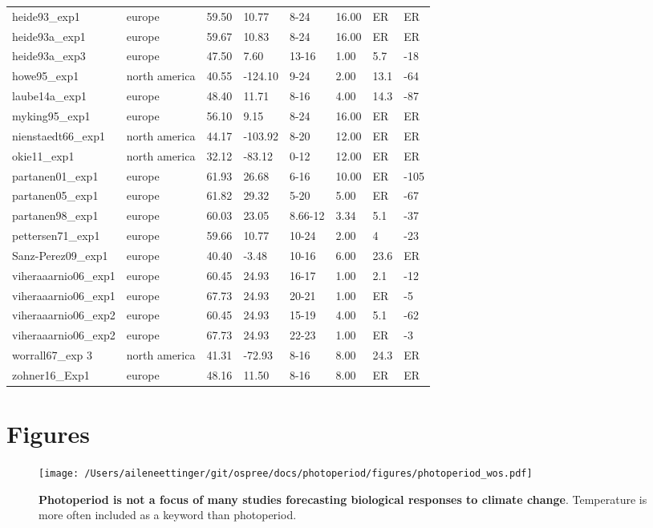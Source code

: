 \documentclass{article}
\begin{document}
\begin{table}[ht]
\begin{tabular}{|p{}|p{}|p{}|p{}|p{}|p{}|p{}|p{}|}
  heide93\_exp1 & europe & 59.50 & 10.77 & 8-24 & 16.00 & ER & ER \\ 
  heide93a\_exp1 & europe & 59.67 & 10.83 & 8-24 & 16.00 & ER & ER \\ 
  heide93a\_exp3 & europe & 47.50 & 7.60 & 13-16 & 1.00 & 5.7 & -18 \\ 
  howe95\_exp1 & north america & 40.55 & -124.10 & 9-24 & 2.00 & 13.1 & -64 \\ 
  laube14a\_exp1 & europe & 48.40 & 11.71 & 8-16 & 4.00 & 14.3 & -87 \\ 
  myking95\_exp1 & europe & 56.10 & 9.15 & 8-24 & 16.00 & ER & ER \\ 
  nienstaedt66\_exp1 & north america & 44.17 & -103.92 & 8-20 & 12.00 & ER & ER \\ 
  okie11\_exp1 & north america & 32.12 & -83.12 & 0-12 & 12.00 & ER & ER \\ 
  partanen01\_exp1 & europe & 61.93 & 26.68 & 6-16 & 10.00 & ER & -105 \\ 
  partanen05\_exp1 & europe & 61.82 & 29.32 & 5-20 & 5.00 & ER & -67 \\ 
  partanen98\_exp1 & europe & 60.03 & 23.05 & 8.66-12 & 3.34 & 5.1 & -37 \\ 
  pettersen71\_exp1 & europe & 59.66 & 10.77 & 10-24 & 2.00 & 4 & -23 \\ 
  Sanz-Perez09\_exp1 & europe & 40.40 & -3.48 & 10-16 & 6.00 & 23.6 & ER \\ 
  viheraaarnio06\_exp1 & europe & 60.45 & 24.93 & 16-17 & 1.00 & 2.1 & -12 \\ 
  viheraaarnio06\_exp1 & europe & 67.73 & 24.93 & 20-21 & 1.00 & ER & -5 \\ 
  viheraaarnio06\_exp2 & europe & 60.45 & 24.93 & 15-19 & 4.00 & 5.1 & -62 \\ 
  viheraaarnio06\_exp2 & europe & 67.73 & 24.93 & 22-23 & 1.00 & ER & -3 \\ 
  worrall67\_exp 3 & north america & 41.31 & -72.93 & 8-16 & 8.00 & 24.3 & ER \\ 
  zohner16\_Exp1 & europe & 48.16 & 11.50 & 8-16 & 8.00 & ER & ER \\ 
   \hline
\end{tabular}
\end{table}\clearpage
\section* {Figures}
\begin{figure}[p]
\centering
\texttt{[image: /Users/aileneettinger/git/ospree/docs/photoperiod/figures/photoperiod\_wos.pdf]} %
\caption{\textbf{Photoperiod is not a focus of many studies forecasting biological responses to climate change}. Temperature is more often included as a keyword than photoperiod.}
 \label{fig:wos}%
 \end{figure}
 
\end{document}
